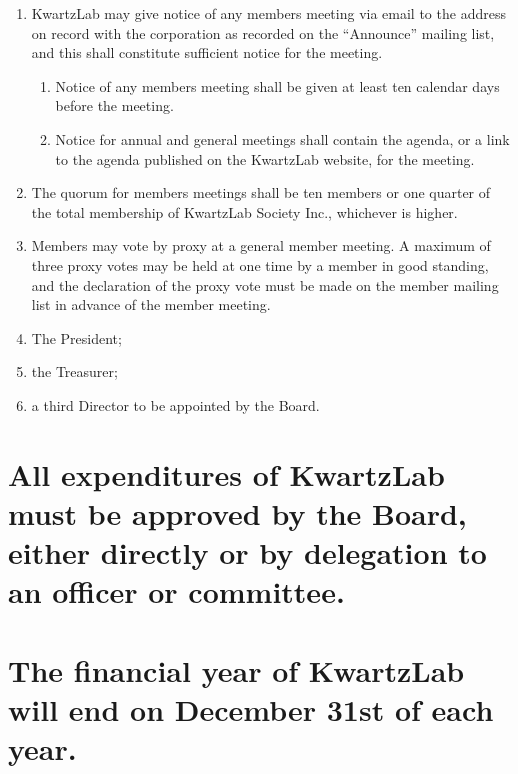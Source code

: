 \documentclass{article}
\begin{document}
\begin{enumerate}
\item KwartzLab may give notice of any members meeting via email to the address on record with the corporation as recorded on the ``Announce'' mailing list, and this shall constitute sufficient notice for the meeting.
	\begin{enumerate}
	\item Notice of any members meeting shall be given at least ten calendar days before the meeting.
	\item Notice for annual and general meetings shall contain the agenda, or a link to the agenda published on the KwartzLab website, for the meeting.
	\end{enumerate}
\item The quorum for members meetings shall be ten members or one quarter of the total membership of KwartzLab Society Inc., whichever is higher.
\item Members may vote by proxy at a general member meeting.  A maximum of three proxy votes may be held at one time by a member in good standing, and the declaration of the proxy vote must be made on the member mailing list in advance of the member meeting.
\item The President;
\item the Treasurer;
\item a third Director to be appointed by the Board.
\end{enumerate}

\section{All expenditures of KwartzLab must be approved by the Board, either directly or by delegation to an officer or committee.}

\section{The financial year of KwartzLab will end on December 31st of each year.}
\end{document}
